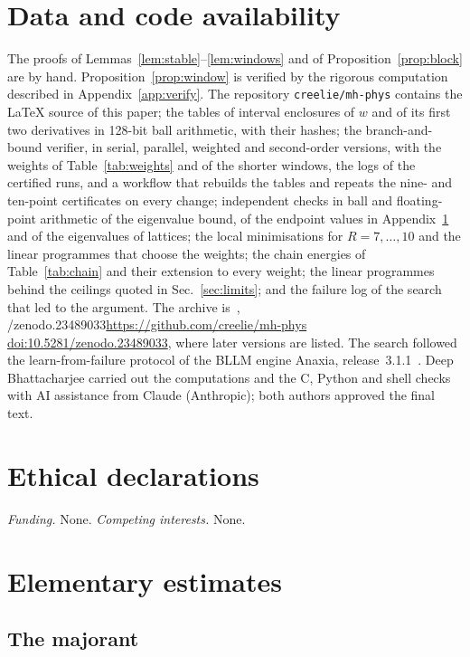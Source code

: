 \documentclass[aps,prd,twocolumn,superscriptaddress,nofootinbib,longbibliography,floatfix,showkeys,amsmath,amssymb,10pt]{revtex4-2}
\theoremstyle{definition}
\theoremstyle{remark}
\def\zenodoID{10.5281/zenodo.23489033}%
\newcommand{\archivelink}{\ifx\zenodoID\empty\url{https://github.com/creelie/mh-phys}%
 \else\href{https://doi.org/\zenodoID}{doi:\zenodoID}\fi}
\begin{document}
\section*{Data and code availability}

The proofs of Lemmas~\ref{lem:stable}--\ref{lem:windows} and of
Proposition~\ref{prop:block} are by hand. Proposition~\ref{prop:window} is
verified by the rigorous computation described in Appendix~\ref{app:verify}.
The repository \texttt{creelie/mh-phys} contains the \LaTeX{} source of this
paper; the tables of interval enclosures of $w$ and of its first two
derivatives in 128-bit ball arithmetic, with their hashes; the
branch-and-bound verifier, in serial, parallel, weighted and second-order
versions, with the weights of Table~\ref{tab:weights} and of the shorter
windows, the logs of the certified runs, and a workflow that rebuilds the
tables and repeats the nine- and ten-point certificates on every change; independent checks in ball and floating-point
arithmetic of the eigenvalue bound, of the endpoint values in
Appendix~\ref{app:details} and of the eigenvalues of lattices; the local
minimisations for $R=7,\dots,10$ and the linear programmes that choose the
weights; the chain energies of Table~\ref{tab:chain} and
their extension to every weight; the linear programmes behind the ceilings
quoted in Sec.~\ref{sec:limits}; and the failure log of the search that led
to the argument. The archive
is~\cite{Archive}, \archivelink, where later versions are listed. The search followed the learn-from-failure protocol of
the BLLM engine Anaxia, release~3.1.1~\cite{Ana26}. Deep Bhattacharjee
carried out the computations and the C, Python and shell checks with AI
assistance from Claude (Anthropic); both authors approved the final text.

\section*{Ethical declarations}

\emph{Funding.} None. \emph{Competing interests.} None.

\appendix

\section{Elementary estimates}\label{app:details}

\subsection{The majorant}
\end{document}
